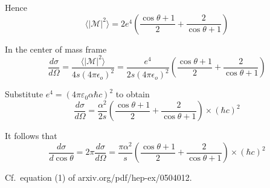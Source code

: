 Hence
\begin{equation*}
\langle|\mathcal{M}|^2\rangle
=2e^4\left(
\frac{\cos\theta+1}{2}+\frac{2}{\cos\theta+1}
\right)
\end{equation*}

In the center of mass frame
\begin{equation*}
\frac{d\sigma}{d\Omega}=\frac{\langle|\mathcal{M}|^2\rangle}{4s(4\pi\epsilon_o)^2}
=\frac{e^4}{2s(4\pi\epsilon_o)^2}\left(\frac{\cos\theta+1}{2}+\frac{2}{\cos\theta+1}\right)
\end{equation*}

Substitute $e^4=(4\pi\varepsilon_0\alpha\hbar c)^2$ to obtain
\begin{equation*}
\frac{d\sigma}{d\Omega}=\frac{\alpha^2}{2s}
\left(\frac{\cos\theta+1}{2}+\frac{2}{\cos\theta+1}\right)\times(\hbar c)^2
\end{equation*}

It follows that
\begin{equation*}
\frac{d\sigma}{d\cos\theta}=2\pi\frac{d\sigma}{d\Omega}
=\frac{\pi\alpha^2}{s}
\left(\frac{\cos\theta+1}{2}+\frac{2}{\cos\theta+1}\right)\times(\hbar c)^2
\end{equation*}

Cf.~equation (1) of arxiv.org/pdf/hep-ex/0504012.

\fi



